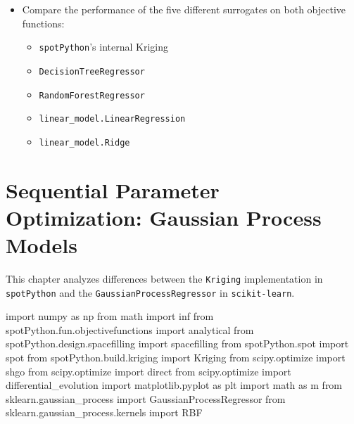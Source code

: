 \documentclass[
  letterpaper,
  DIV=11,
  numbers=noendperiod]{scrreprt}
\newenvironment{Shaded}{\begin{snugshade}}{\end{snugshade}}
\newcommand{\ImportTok}[1]{\textcolor[rgb]{0.00,0.46,0.62}{#1}}
\newcommand{\NormalTok}[1]{\textcolor[rgb]{0.00,0.23,0.31}{#1}}
\providecommand{\tightlist}{%
  \setlength{\itemsep}{0pt}\setlength{\parskip}{0pt}}\usepackage{longtable,booktabs,array}
\begin{document}
\begin{itemize}
\item
  Compare the performance of the five different surrogates on both
  objective functions:

  \begin{itemize}
  \tightlist
  \item
    \texttt{spotPython}'s internal Kriging
  \item
    \texttt{DecisionTreeRegressor}
  \item
    \texttt{RandomForestRegressor}
  \item
    \texttt{linear\_model.LinearRegression}
  \item
    \texttt{linear\_model.Ridge}
  \end{itemize}
\end{itemize}

\chapter{Sequential Parameter Optimization: Gaussian Process
Models}\label{sec-gaussian-process-models}

This chapter analyzes differences between the \texttt{Kriging}
implementation in \texttt{spotPython} and the
\texttt{GaussianProcessRegressor} in \texttt{scikit-learn}.

\begin{Shaded}
\begin{Highlighting}[]
\ImportTok{import}\NormalTok{ numpy }\ImportTok{as}\NormalTok{ np}
\ImportTok{from}\NormalTok{ math }\ImportTok{import}\NormalTok{ inf}
\ImportTok{from}\NormalTok{ spotPython.fun.objectivefunctions }\ImportTok{import}\NormalTok{ analytical}
\ImportTok{from}\NormalTok{ spotPython.design.spacefilling }\ImportTok{import}\NormalTok{ spacefilling}
\ImportTok{from}\NormalTok{ spotPython.spot }\ImportTok{import}\NormalTok{ spot}
\ImportTok{from}\NormalTok{ spotPython.build.kriging }\ImportTok{import}\NormalTok{ Kriging}
\ImportTok{from}\NormalTok{ scipy.optimize }\ImportTok{import}\NormalTok{ shgo}
\ImportTok{from}\NormalTok{ scipy.optimize }\ImportTok{import}\NormalTok{ direct}
\ImportTok{from}\NormalTok{ scipy.optimize }\ImportTok{import}\NormalTok{ differential\_evolution}
\ImportTok{import}\NormalTok{ matplotlib.pyplot }\ImportTok{as}\NormalTok{ plt}
\ImportTok{import}\NormalTok{ math }\ImportTok{as}\NormalTok{ m}
\ImportTok{from}\NormalTok{ sklearn.gaussian\_process }\ImportTok{import}\NormalTok{ GaussianProcessRegressor}
\ImportTok{from}\NormalTok{ sklearn.gaussian\_process.kernels }\ImportTok{import}\NormalTok{ RBF}
\end{Highlighting}
\end{Shaded}
\end{document}
